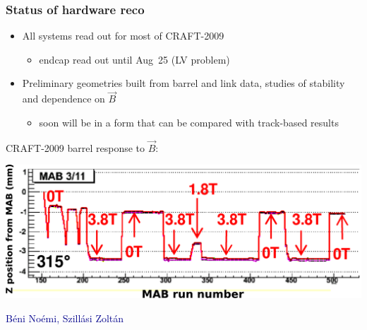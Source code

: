 \documentclass[compress]{beamer}
\begin{document}
\begin{frame}
\frametitle{Status of hardware reco}

\begin{itemize}\setlength{\itemsep}{0.25 cm}
\item All systems read out for most of CRAFT-2009
\begin{itemize}
\item endcap read out until Aug~25 (LV problem)
\end{itemize}
\item Preliminary geometries built from barrel and link data, studies
  of stability and dependence on $\vec{B}$
\begin{itemize}
\item soon will be in a form that can be compared with track-based
  results
\end{itemize}
\end{itemize}

\vfill
{\large CRAFT-2009 barrel response to $\vec{B}$:}
\begin{center}
\includegraphics[width=0.75\linewidth]{hardware_reco.pdf}
\end{center}

\vspace{-0.5 cm}
\hfill \textcolor{darkblue}{\scriptsize B\'eni No\'emi, Szill\'asi Zolt\'an}
\end{frame}
\end{document}
